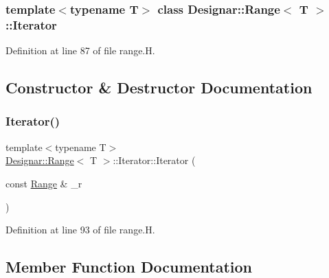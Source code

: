 \subsubsection*{template$<$typename T$>$\newline
class Designar\+::\+Range$<$ T $>$\+::\+Iterator}



Definition at line 87 of file range.\+H.



\subsection{Constructor \& Destructor Documentation}
\mbox{\label{class_designar_1_1_range_1_1_iterator_a25257fadc62207bcc4ca4b82b2b4c0cb}} 
\subsubsection{\texorpdfstring{Iterator()}{Iterator()}}
{\footnotesize\ttfamily template$<$typename T$>$ \\
\hyperlink{class_designar_1_1_range}{Designar\+::\+Range}$<$ T $>$\+::Iterator\+::\+Iterator (\begin{DoxyParamCaption}\item[{const \hyperlink{class_designar_1_1_range}{Range} \&}]{\+\_\+r }\end{DoxyParamCaption})\hspace{0.3cm}{\ttfamily [inline]}}



Definition at line 93 of file range.\+H.



\subsection{Member Function Documentation}
\mbox{\label{class_designar_1_1_range_1_1_iterator_a388c108434e6ff65af07ee3bc0d98204}} 
